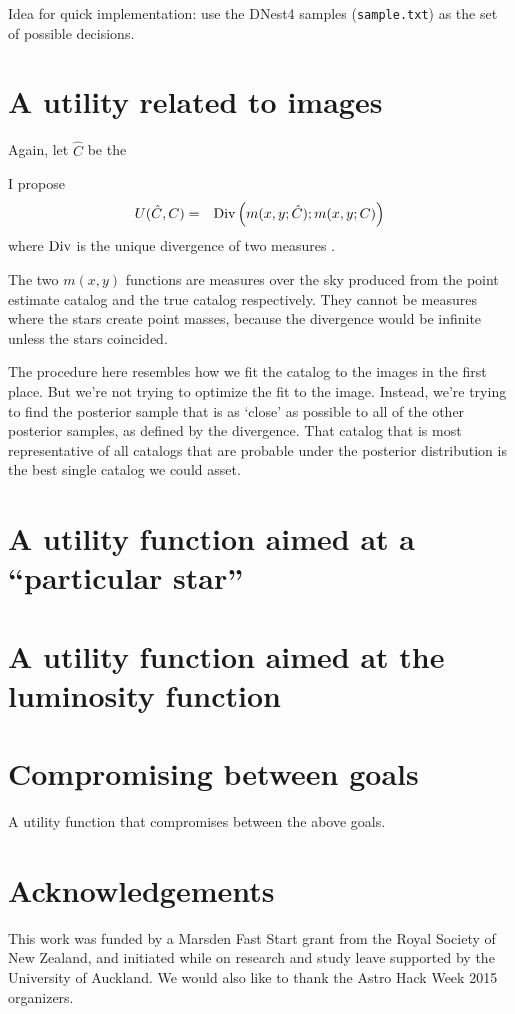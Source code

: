 \documentclass[a4paper,fleqn,usenatbib]{mnras}
\begin{document}
Idea for quick implementation: use the DNest4 samples ({\tt sample.txt})
as the set of possible decisions.

\section{A utility related to images}
Again, let $\hat{C}$ be the 

I propose
\begin{eqnarray}
U(\hat{C}, C) &=& \textnormal{Div}\left(m(x, y; \hat{C}); m(x, y; C)\right)
\end{eqnarray}
where $\textnormal{Div}$ is the unique divergence of
two measures \citep{knuth2012foundations}.

The two $m(x, y)$ functions are measures over the sky produced from the
point estimate catalog and the true catalog respectively. They cannot be
measures where the stars create point masses, because the divergence would
be infinite unless the stars coincided.

The procedure here resembles how we fit the catalog to the images in the
first place. But we're not trying to optimize the fit to the image. Instead,
we're trying to find the posterior sample that is as `close' as possible to
all of the other posterior samples, as defined by the divergence. That catalog
that is most representative of all catalogs that are probable under the
posterior distribution is the best single catalog we could asset.

\section{A utility function aimed at a ``particular star''}


\section{A utility function aimed at the luminosity function}


\section{Compromising between goals}
A utility function that compromises between the above goals.



\section*{Acknowledgements}
This work was funded by a Marsden Fast Start grant from the Royal Society of
New Zealand, and initiated while on research and study leave supported by
the University of Auckland. We would also like to thank the Astro Hack Week
2015 organizers.
\end{document}
